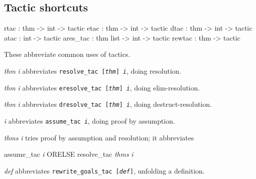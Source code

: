 \subsection{Tactic shortcuts}
\begin{ttbox} 
rtac     :      thm -> int -> tactic
etac     :      thm -> int -> tactic
dtac     :      thm -> int -> tactic
atac     :             int -> tactic
ares_tac : thm list -> int -> tactic
rewtac   :      thm ->        tactic
\end{ttbox}
These abbreviate common uses of tactics.
\begin{ttdescription}
\item[\ttindexbold{rtac} {\it thm} {\it i}] 
abbreviates \hbox{\tt resolve_tac [{\it thm}] {\it i}}, doing resolution.

\item[\ttindexbold{etac} {\it thm} {\it i}] 
abbreviates \hbox{\tt eresolve_tac [{\it thm}] {\it i}}, doing elim-resolution.

\item[\ttindexbold{dtac} {\it thm} {\it i}] 
abbreviates \hbox{\tt dresolve_tac [{\it thm}] {\it i}}, doing
destruct-resolution.

\item[\ttindexbold{atac} {\it i}] 
abbreviates \hbox{\tt assume_tac {\it i}}, doing proof by assumption.

\item[\ttindexbold{ares_tac} {\it thms} {\it i}] 
tries proof by assumption and resolution; it abbreviates
\begin{ttbox}
assume_tac {\it i} ORELSE resolve_tac {\it thms} {\it i}
\end{ttbox}

\item[\ttindexbold{rewtac} {\it def}] 
abbreviates \hbox{\tt rewrite_goals_tac [{\it def}]}, unfolding a definition.
\end{ttdescription}


